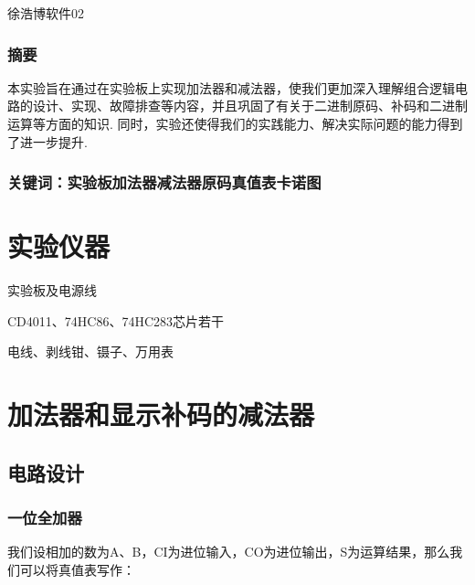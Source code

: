 \documentclass[UTF8]{ctexart}
\begin{document}
\renewcommand{\thefootnote}{\fnsymbol{footnote}}
\linespread{1.4}
\title{\vspace{-5em}\vspace{-2.5em}}
\date{}
\maketitle
\begin{center}
{\fangsong 徐浩博\quad 软件02}
\end{center}

\subsubsection*{摘要}
{\kaishu\normalsize  本实验旨在通过在实验板上实现加法器和减法器，使我们更加深入理解组合逻辑电路的设计、实现、故障排查等内容，并且巩固了有关于二进制原码、补码和二进制运算等方面的知识. 同时，实验还使得我们的实践能力、解决实际问题的能力得到了进一步提升.
\subsubsection*{关键词：实验板\quad 加法器\quad 减法器\quad 原码 \quad 真值表\quad 卡诺图 \vspace{1.5em}}
\songti

\section{实验仪器}
实验板及电源线\par
CD4011、74HC86、74HC283芯片若干\par
电线、剥线钳、镊子、万用表\par
\par

\section{加法器和显示补码的减法器}
\subsection{电路设计}
\subsubsection{一位全加器}
我们设相加的数为A、B，CI为进位输入，CO为进位输出，S为运算结果，那么我们可以将真值表写作：

}
\end{document}

